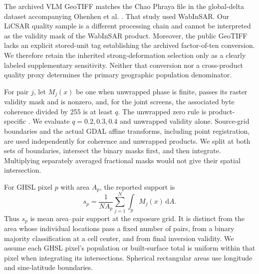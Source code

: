 \documentclass[pdflatex,sn-nature]{sn-jnl}
\begin{document}
The archived VLM GeoTIFF matches the Chao Phraya file in the global-delta dataset accompanying Ohenhen et al. \citep{ohenhen2026deltas,ohenhen2025deltadata}. That study used WabInSAR. Our LiCSAR quality sample is a different processing chain and cannot be interpreted as the validity mask of the WabInSAR product. Moreover, the public GeoTIFF lacks an explicit stored-unit tag establishing the archived factor-of-ten conversion. We therefore retain the inherited strong-deformation selection only as a clearly labeled supplementary sensitivity. Neither that conversion nor a cross-product quality proxy determines the primary geographic population denominator.

For pair $j$, let $M_j(x)$ be one when unwrapped phase is finite, passes its raster validity mask and is nonzero, and, for the joint screens, the associated byte coherence divided by 255 is at least $q$. The unwrapped zero rule is product-specific \citep{licsarproducts}. We evaluate $q=0.2,0.3,0.4$ and unwrapped validity alone. Source-grid boundaries and the actual GDAL affine transforms, including point registration, are used independently for coherence and unwrapped products. We split at both sets of boundaries, intersect the binary masks first, and then integrate. Multiplying separately averaged fractional masks would not give their spatial intersection.

For GHSL pixel $p$ with area $A_p$, the reported support is
\begin{equation}
s_p=\frac{1}{N A_p}\sum_{j=1}^{N}\int_p M_j(x)\,\mathrm{d}A.
\label{eq:support}
\end{equation}
Thus $s_p$ is mean area--pair support at the exposure grid. It is distinct from the area whose individual locations pass a fixed number of pairs, from a binary majority classification at a cell center, and from final inversion validity. We assume each GHSL pixel's population or built-surface total is uniform within that pixel when integrating its intersections. Spherical rectangular areas use longitude and sine-latitude boundaries.
\end{document}
